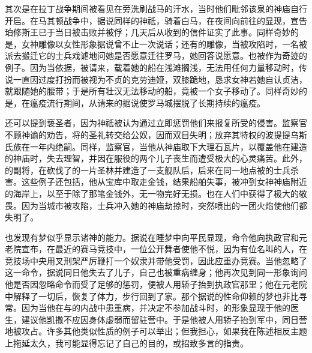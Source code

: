 其次是在拉丁战争期间被看见在旁洗刷战马的汗水，当时他们毗邻该泉的神庙自行开启。在马其顿战争中，据说同样的神祇，骑着白马，在夜间向前往的显现，宣告珀修斯王已于当日被击败并被俘；几天后从收到的信件证实了此事。同样奇妙的是，女神雕像以女性形象据说曾不止一次说话；还有的雕像，当被攻陷时，一名被派去搬迁它的士兵戏谑地问她是否愿意迁往罗马，她回答说愿意。也被作为奇迹的例子。因为当依据，被请来，载着她的船在浅滩搁浅，无法用任何力量移动时，传说一直因过度打扮而被视为不贞的克劳迪娅，双膝跪地，恳求女神若她自认贞洁，就跟随她的腰带；于是所有壮汉无法移动的船，竟被一个女子移动了。同样奇妙的是，在瘟疫流行期间，从请来的据说使罗马城摆脱了长期持续的瘟疫。\par

还可以提到亵圣者，因为神祇被认为通过立即惩罚他们来报复所受的侵害。监察官不顾神谕的劝告，将的圣礼转交给公奴，因而双目失明；放弃其特权的波提提乌斯氏族在一年内绝嗣。同样，监察官，当他从神庙取下大理石瓦片，以覆盖他在建造的神庙时，失去理智，并因在服役的两个儿子丧生而遭受极大的心灵痛苦。此外，的副将，在砍伐了的一片圣林并建造了一支舰队后，后来在同一地点被的士兵杀害。这些例子还包括，他从宝库中取走金钱，结果船舶失事，被冲到女神神庙附近的海岸上，以至于除了那笔金钱外，无一物完好无损。也在人们中获得了极大的敬畏。因为当城市被攻陷，士兵冲入她的神庙劫掠时，突然喷出的一团火焰使他们都失明了。\par

也发现有梦似乎显示诸神的能力。据说在睡梦中向平民显现，命令他向执政官和元老院宣布，在最近的赛马竞技中，一位公开舞者使他不悦，因为有位名叫的人，在竞技场中央用叉刑架严厉鞭打一个奴隶并带他受罚，因此应重办竞赛。当他忽略了这一命令，据说同日他失去了儿子，自己也被重病缠身；他再次见到同一形象询问他是否因忽略命令而受了足够的惩罚，便被人用轿子抬到执政官那里；他在元老院中解释了一切后，恢复了体力，步行回到了家。那个据说的性命仰赖的梦也非比寻常。因为当他在与的内战中患重病，并决定不参加战斗时，的形象显现于他的医生，建议他凯撒不应因身体虚弱而留驻营中。于是他被人用轿子抬到军中，同日营地被攻占。许多其他类似性质的例子可以举出；但我担心，如果我在陈述相反主题上拖延太久，我可能显得忘记了自己的目的，或招致多言的指责。\par

